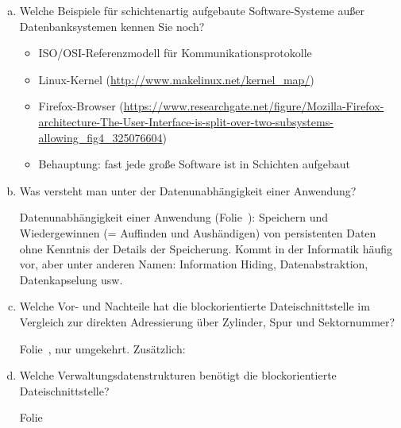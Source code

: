 \begin{enumerate}[a)]
	\item Welche Beispiele für schichtenartig aufgebaute Software-Systeme außer Datenbanksystemen kennen Sie noch?

	\begin{solution}
	\begin{itemize}
		\item ISO/OSI-Referenzmodell für Kommunikationsprotokolle
		\item Linux-Kernel (\url{http://www.makelinux.net/kernel_map/})
		\item Firefox-Browser (\url{https://www.researchgate.net/figure/Mozilla-Firefox-architecture-The-User-Interface-is-split-over-two-subsystems-allowing_fig4_325076604})
		\item Behauptung: fast jede große Software ist in Schichten aufgebaut
	\end{itemize}
	\end{solution}


	\item Was versteht man unter der Datenunabhängigkeit einer Anwendung?

	\begin{solution}
	Datenunabhängigkeit einer Anwendung (Folie~\Datenunabhaengig): Speichern und Wiedergewinnen (= Auffinden und Aushändigen) von persistenten Daten ohne Kenntnis der Details der Speicherung.
	Kommt in der Informatik häufig vor, aber unter anderen Namen: Information Hiding, Datenabstraktion, Datenkapselung usw.
	\end{solution}

	\item Welche \deepen Vor- und Nachteile hat die blockorientierte Dateischnittstelle im Vergleich zur direkten Adressierung über Zylinder, Spur und Sektornummer?

	\begin{note}
		Folie~\LogischeSpeichergeraete, nur umgekehrt.
		Zusätzlich:~\Geraeteunabhaengigkeit
	\end{note}

	\item Welche \deepen Verwaltungsdatenstrukturen benötigt die blockorientierte Dateischnittstelle?

	\begin{note}
		Folie~\Dateikatalog
	\end{note}
\end{enumerate}
\beamertxt{\pagebreak}

